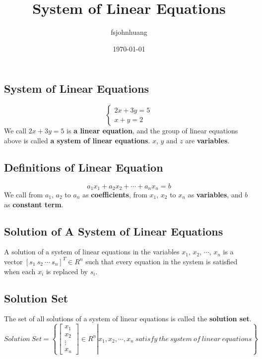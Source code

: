 \documentclass[14pt]{article}
\begin{document}
\tableofcontents
\title{System of Linear Equations}
\author{fsjohnhuang}
\date{\today}
\maketitle

\begin{CJK}{UTF8}{min}
\section{System of Linear Equations}
\begin{equation}
\left\lbrace 
\begin{array}{c}
2x+3y=5 \\
 x+y=2 
\end{array}\right.
\end{equation}
We call $2x+3y=5$ is \textbf{a linear equation}, and the group of linear equations above is called \textbf{a system of linear equations}. $x$, $y$ and $z$ are \textbf{variables}.
\subsection{Definitions of Linear Equation}
$$a_1x_1 + a_2x_2+ \cdots + a_nx_n=b$$
We call from $a_1$, $a_2$ to $a_n$ as \textbf{coefficients}, from $x_1$, $x_2$ to $x_n$ as \textbf{variables}, and $b$ as \textbf{constant term}.
\subsection{Solution of A System of Linear Equations}
A solution of a system of linear equations in the variables $x_1$, $x_2$, $\cdots$, $x_n$ is a vector $[s_1\ s_2\ \cdots \ s_n]^T \in R^n$ such that every equation in the system is satisfied when each $x_i$ is replaced by $s_i$.
\subsection{Solution Set}
The set of all solutions of a system of linear equations is called the \textbf{solution set}.
\begin{equation}
Solution\ Set=\left\lbrace
\left.
\left[
\begin{array}{c}
x_1\\
x_2\\
\vdots \\
x_n
\end{array}
\right]
\in R^n
\right|
x_1,x_2,\cdots,x_n\ satisfy\ the\ system\ of\ linear\ equations
\right\rbrace
\end{equation}

\end{CJK}
\end{document}
